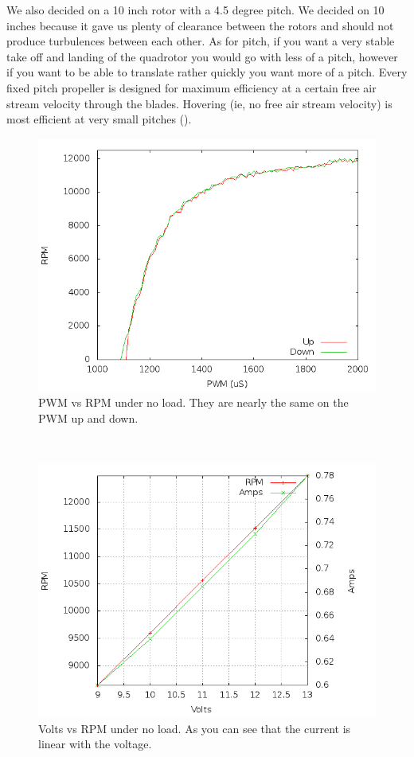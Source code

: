 \documentclass{article}
\numberwithin{equation}{section} %
\begin{document}
We also decided on a 10 inch rotor with a 4.5 degree pitch. We decided on 10 inches because it gave us plenty of clearance between the rotors and should not produce turbulences between each other. As for pitch, if you want a very stable take off and landing of the quadrotor you would go with less of a pitch, however if you want to be able to translate rather quickly you want more of a pitch. Every fixed pitch propeller is designed for maximum efficiency at a certain free air stream velocity through the blades. Hovering (ie, no free air stream velocity) is most efficient at very small pitches (\cite{propeller_pitch}).
\\
\begin{figure}[h!]
  \centering
	\includegraphics[scale=.40]{pwm_vs_rpm.png}
  \caption{PWM vs RPM under no load. They are nearly the same on the PWM up and down.}
\end{figure}  
\\
\begin{figure}[h!]
  \centering
	\includegraphics[scale=.40]{volts_vs_rpm.png}
  \caption{Volts vs RPM under no load. As you can see that the current is linear with the voltage.}
\end{figure}  
\end{document}
